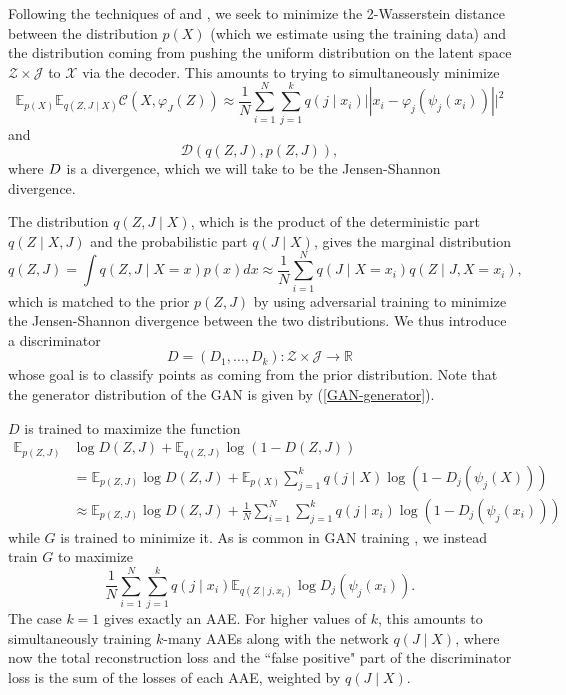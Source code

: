 \documentclass[reqno,11pt]{article}
\renewcommand{\phi}{\varphi}
\newcommand{\X}{\mathcal{X}}
\newcommand{\Z}{\mathcal{Z}}
\newcommand{\D}{\mathcal{D}}
\newcommand{\R}{\mathbb{R}}
\newcommand{\E}{\mathbb E}
\begin{document}
Following the techniques of \cite{WAE} and \cite{AAE}, we seek to minimize the 2-Wasserstein distance between the distribution $p(X)$ (which we estimate using the training data) and the distribution coming from pushing the uniform distribution on the latent space $\Z \times \mathcal J$ to $\X$ via the decoder. This amounts to trying to simultaneously minimize
\begin{equation}
\E_{p(X)} \E_{q(Z, J\mid X)} \mathcal C(X,\phi_J(Z)) \approx \frac{1}{N} \sum_{i=1}^N \sum_{j=1}^k q(j \mid x_i) \mathcal ||x_i - \phi_j(\psi_j(x_i))||^2 \label{AE-objective}
\end{equation}
and
\[
\mathcal D(q(Z, J), p(Z, J)),
\]
where $\mathcal \D$ is a divergence, which we will take to be the Jensen-Shannon divergence. 

The distribution $q(Z,J \mid X)$, which is the product of the deterministic part $q(Z \mid X,J)$ and the probabilistic part $q(J \mid X)$, gives the marginal distribution
\begin{equation} \label{GAN-generator}
q(Z,J) = \int q(Z,J \mid X=x) p(x) dx \approx \frac{1}{N} \sum_{i=1}^N q(J \mid X=x_i) q(Z \mid J, X = x_i),
\end{equation}
which is matched to the prior $p(Z, J)$ by using adversarial training to minimize the Jensen-Shannon divergence between the two distributions.  We thus introduce a discriminator 
\[
D  = (D_1,\ldots, D_k) : \Z \times \mathcal J \to \R
\]
whose goal is to classify points as coming from the prior distribution.  Note that the generator distribution of the GAN is given by (\ref{GAN-generator}).


$D$ is trained to maximize the function
\begin{align}
\E_{p(Z,J)} &\log D(Z,J) + \E_{q(Z,J)} \log(1 - D(Z,J)) \nonumber\\
&= \E_{p(Z,J)} \log D(Z,J) + \E_{p(X)} \sum_{j=1}^k q(j \mid X) \log(1 - D_j(\psi_j(X))) \nonumber\\
&\approx \E_{p(Z,J)} \log D(Z,J) + \frac{1}{N} \sum_{i=1}^N \sum_{j=1}^k q(j \mid x_i) \log(1 - D_j(\psi_j(x_i)))   \label{D-objective}
\end{align}
while $G$ is trained to minimize it. As is common in GAN training \cite{GAN, WAE}, we instead train $G$ to maximize
\begin{equation}
\frac{1}{N} \sum_{i=1}^N \sum_{j=1}^k q(j \mid x_i) \E_{q(Z \mid j,x_i)} \log D_j(\psi_j(x_i)). \label{G-objective}
\end{equation}
The case $k=1$ gives exactly an AAE. For higher values of $k$, this amounts to simultaneously training $k$-many AAEs along with the network $q(J \mid X)$, where now the total reconstruction loss and the ``false positive" part of the discriminator loss is the sum of the losses of each AAE, weighted by $q(J\mid X)$. 
\end{document}
